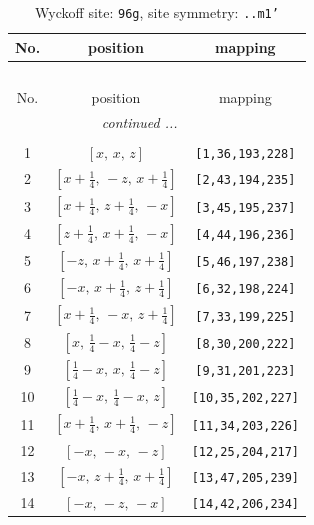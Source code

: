 \documentclass[fleqn,8pt]{jsarticle}
\begin{document}
\begin{longtable}{ccc}
\caption{Wyckoff site: {\tt 96g}, site symmetry: {\tt ..m1'}}
 \\
 \hline \hline
No. & position & mapping \\ \hline \endfirsthead

\multicolumn{2}{l}{\tablename\ \thetable{}} \\
 \hline \hline
No. & position & mapping \\ \hline \endhead

 \hline \hline
\multicolumn{2}{r}{\footnotesize\it continued ...} \\ \endfoot

 \hline \hline
\multicolumn{2}{r}{} \\ \endlastfoot

1 & $\left[ x,\, x,\, z \right]$ & {\tt [1,36,193,228]} \\ \hline
2 & $\left[ x + \frac{1}{4},\, - z,\, x + \frac{1}{4} \right]$ & {\tt [2,43,194,235]} \\ \hline
3 & $\left[ x + \frac{1}{4},\, z + \frac{1}{4},\, - x \right]$ & {\tt [3,45,195,237]} \\ \hline
4 & $\left[ z + \frac{1}{4},\, x + \frac{1}{4},\, - x \right]$ & {\tt [4,44,196,236]} \\ \hline
5 & $\left[ - z,\, x + \frac{1}{4},\, x + \frac{1}{4} \right]$ & {\tt [5,46,197,238]} \\ \hline
6 & $\left[ - x,\, x + \frac{1}{4},\, z + \frac{1}{4} \right]$ & {\tt [6,32,198,224]} \\ \hline
7 & $\left[ x + \frac{1}{4},\, - x,\, z + \frac{1}{4} \right]$ & {\tt [7,33,199,225]} \\ \hline
8 & $\left[ x,\, \frac{1}{4} - x,\, \frac{1}{4} - z \right]$ & {\tt [8,30,200,222]} \\ \hline
9 & $\left[ \frac{1}{4} - x,\, x,\, \frac{1}{4} - z \right]$ & {\tt [9,31,201,223]} \\ \hline
10 & $\left[ \frac{1}{4} - x,\, \frac{1}{4} - x,\, z \right]$ & {\tt [10,35,202,227]} \\ \hline
11 & $\left[ x + \frac{1}{4},\, x + \frac{1}{4},\, - z \right]$ & {\tt [11,34,203,226]} \\ \hline
12 & $\left[ - x,\, - x,\, - z \right]$ & {\tt [12,25,204,217]} \\ \hline
13 & $\left[ - x,\, z + \frac{1}{4},\, x + \frac{1}{4} \right]$ & {\tt [13,47,205,239]} \\ \hline
14 & $\left[ - x,\, - z,\, - x \right]$ & {\tt [14,42,206,234]} \\ \hline

\end{longtable}
\end{document}
